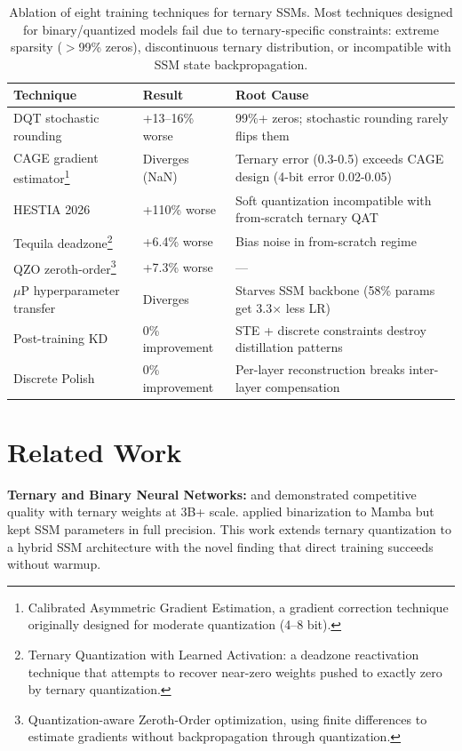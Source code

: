 \documentclass{article}
\begin{document}
\begin{table}[t]
\centering
\small
\caption{Ablation of eight training techniques for ternary SSMs. Most techniques designed for binary/quantized models fail due to ternary-specific constraints: extreme sparsity ($>$99\% zeros), discontinuous ternary distribution, or incompatible with SSM state backpropagation.}
\label{tab:negative_results}
\begin{tabular}{p{3cm}p{2.8cm}p{3.5cm}}
\toprule
\textbf{Technique} & \textbf{Result} & \textbf{Root Cause} \\
\midrule
DQT stochastic rounding \citep{li2016ternary} & +13--16\% worse & 99\%+ zeros; stochastic rounding rarely flips them \\
CAGE gradient estimator\footnote{Calibrated Asymmetric Gradient Estimation, a gradient correction technique originally designed for moderate quantization (4--8 bit).} & Diverges (NaN) & Ternary error (0.3-0.5) exceeds CAGE design (4-bit error 0.02-0.05) \\
HESTIA 2026 \citep{hestia2026} & +110\% worse & Soft quantization incompatible with from-scratch ternary QAT \\
Tequila deadzone\footnote{Ternary Quantization with Learned Activation: a deadzone reactivation technique that attempts to recover near-zero weights pushed to exactly zero by ternary quantization.} & +6.4\% worse & Bias noise in from-scratch regime \\
QZO zeroth-order\footnote{Quantization-aware Zeroth-Order optimization, using finite differences to estimate gradients without backpropagation through quantization.} & +7.3\% worse & --- \\
$\mu$P \citep{yang2022tensor} hyperparameter transfer & Diverges & Starves SSM backbone (58\% params get 3.3$\times$ less LR) \\
Post-training KD & 0\% improvement & STE + discrete constraints destroy distillation patterns \\
Discrete Polish & 0\% improvement & Per-layer reconstruction breaks inter-layer compensation \\
\bottomrule
\end{tabular}
\end{table}

\section{Related Work}

\textbf{Ternary and Binary Neural Networks:} \citet{wang2023bitnet} and \citet{ma2024era} demonstrated competitive quality with ternary weights at 3B+ scale. \citet{bimamba2024} applied binarization to Mamba but kept SSM parameters in full precision. This work extends ternary quantization to a hybrid SSM architecture with the novel finding that direct training succeeds without warmup.
\end{document}

